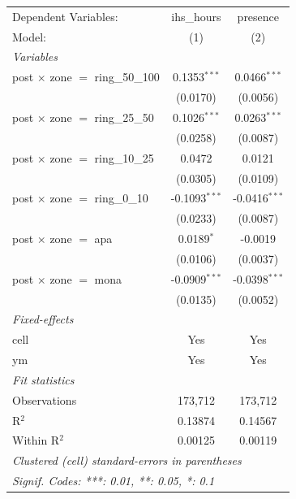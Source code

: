 
\begingroup
\centering
\begin{tabular}{lcc}
   \tabularnewline \midrule \midrule
   Dependent Variables:                    & ihs\_hours      & presence\\  
   Model:                                  & (1)             & (2)\\  
   \midrule
   \emph{Variables}\\
   post $\times$ zone $=$ ring\_50\_100    & 0.1353$^{***}$  & 0.0466$^{***}$\\   
                                           & (0.0170)        & (0.0056)\\   
   post $\times$ zone $=$ ring\_25\_50     & 0.1026$^{***}$  & 0.0263$^{***}$\\   
                                           & (0.0258)        & (0.0087)\\   
   post $\times$ zone $=$ ring\_10\_25     & 0.0472          & 0.0121\\   
                                           & (0.0305)        & (0.0109)\\   
   post $\times$ zone $=$ ring\_0\_10      & -0.1093$^{***}$ & -0.0416$^{***}$\\   
                                           & (0.0233)        & (0.0087)\\   
   post $\times$ zone $=$ apa              & 0.0189$^{*}$    & -0.0019\\   
                                           & (0.0106)        & (0.0037)\\   
   post $\times$ zone $=$ mona             & -0.0909$^{***}$ & -0.0398$^{***}$\\   
                                           & (0.0135)        & (0.0052)\\   
   \midrule
   \emph{Fixed-effects}\\
   cell                                    & Yes             & Yes\\  
   ym                                      & Yes             & Yes\\  
   \midrule
   \emph{Fit statistics}\\
   Observations                            & 173,712         & 173,712\\  
   R$^2$                                   & 0.13874         & 0.14567\\  
   Within R$^2$                            & 0.00125         & 0.00119\\  
   \midrule \midrule
   \multicolumn{3}{l}{\emph{Clustered (cell) standard-errors in parentheses}}\\
   \multicolumn{3}{l}{\emph{Signif. Codes: ***: 0.01, **: 0.05, *: 0.1}}\\
\end{tabular}
\par\endgroup


